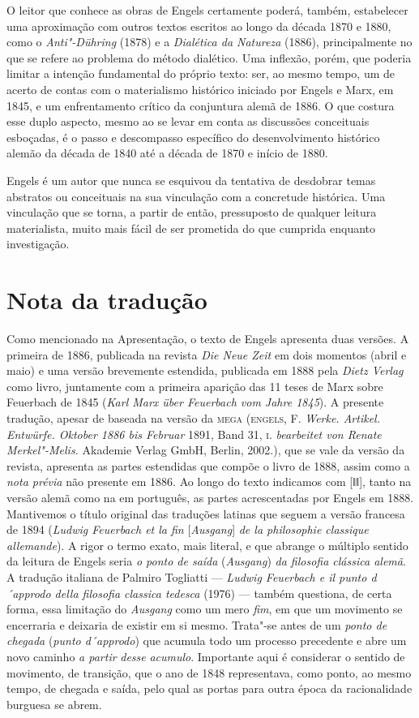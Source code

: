 O leitor que conhece as obras de Engels certamente poderá,
também, estabelecer uma aproximação com outros textos escritos ao longo
da década 1870 e 1880, como o \emph{Anti"-Dühring} (1878) e a
\emph{Dialética da Natureza} (1886), principalmente no que se refere ao
problema do método dialético. Uma inflexão, porém, que poderia limitar a
intenção fundamental do próprio texto: ser, ao mesmo tempo,
um de acerto de contas com o materialismo histórico iniciado por Engels e
Marx, em 1845, e um enfrentamento crítico da conjuntura alemã de 1886. O
que costura esse duplo aspecto, mesmo ao se levar em conta as discussões
conceituais esboçadas, é o passo e descompasso específico do
desenvolvimento histórico alemão da década de 1840 até a década de 1870
e início de 1880.

Engels é um autor que nunca se esquivou da tentativa de desdobrar temas
abstratos ou conceituais na sua vinculação com a concretude histórica.
Uma vinculação que se torna, a partir de então, pressuposto de qualquer
leitura materialista, muito mais fácil de ser prometida do que cumprida
enquanto investigação.

\pagebreak
\section*{Nota da tradução}

Como mencionado na Apresentação, o texto de Engels apresenta duas versões. A primeira de 1886, publicada
na revista \emph{Die Neue Zeit} em dois momentos (abril e maio) e uma
versão brevemente estendida, publicada em 1888 pela \emph{Dietz Verlag}
como livro, juntamente com a primeira aparição das 11 teses de Marx
sobre Feuerbach de 1845 (\emph{Karl Marx über Feuerbach vom Jahre
1845}). A presente tradução, apesar de baseada na versão da
\textsc{mega} (\textsc{engels}, F. \emph{Werke. Artikel. Entwürfe.
Oktober 1886 bis Februar} 1891, Band 31, \textsc{i}. \emph{bearbeitet
von Renate Merkel"-Melis.} Akademie Verlag GmbH, Berlin, 2002.), que se
vale da versão da revista, apresenta as partes estendidas que compõe o
livro de 1888, assim como a \emph{nota prévia} não presente em 1886. Ao
longo do texto indicamos com {[}ǁǁ{]}, tanto na versão alemã como na em
português, as partes acrescentadas por Engels em 1888. Mantivemos o título original das traduções latinas que
seguem a versão francesa de 1894 (\emph{Ludwig Feuerbach et la fin}
{[}\emph{Ausgang}{]} \emph{de la philosophie classique allemande}). A
rigor o termo exato, mais literal, e que abrange o múltiplo sentido da
leitura de Engels seria \emph{o ponto de saída} (\emph{Ausgang})
\emph{da filosofia clássica alemã}. A tradução italiana de Palmiro
Togliatti --- \emph{Ludwig Feuerbach e il punto d´approdo della filosofia
classica tedesca} (1976) --- também questiona, de certa forma, essa
limitação do \emph{Ausgang} como um mero \emph{fim}, em que um movimento
se encerraria e deixaria de existir em si mesmo. Trata"-se antes de um
\emph{ponto de chegada} (\emph{punto d´approdo}) que acumula todo um
processo precedente e abre um novo caminho \emph{a partir} \emph{desse}
\emph{acumulo}. Importante aqui é considerar o sentido de movimento, de
transição, que o ano de 1848 representava, como ponto, ao mesmo tempo,
de chegada e saída, pelo qual as portas para outra época da
racionalidade burguesa se abrem.

